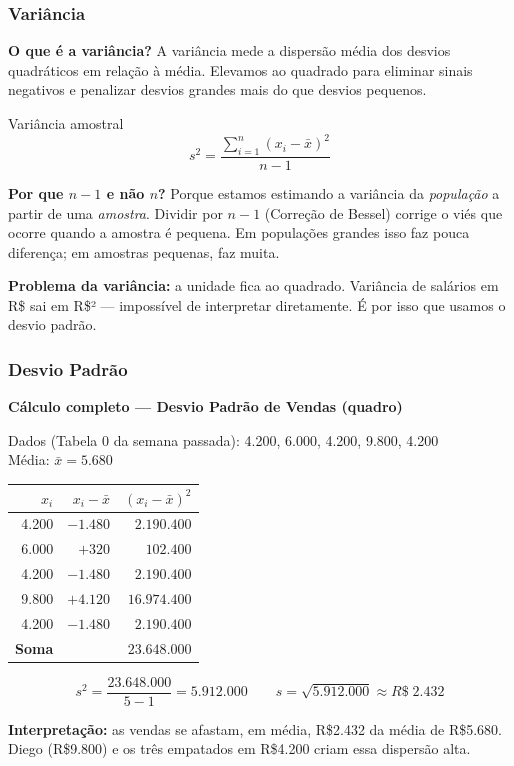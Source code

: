 \subsubsection*{Variância}

\begin{SolvedBox}
\textbf{O que é a variância?} A variância mede a dispersão média dos desvios
quadráticos em relação à média. Elevamos ao quadrado para eliminar sinais
negativos e penalizar desvios grandes mais do que desvios pequenos.

\begin{FormulaBox}{Variância amostral}
\[
s^2 = \frac{\sum_{i=1}^{n}(x_i - \bar{x})^2}{n - 1}
\]
\end{FormulaBox}

\textbf{Por que $n-1$ e não $n$?} Porque estamos estimando a variância da
\emph{população} a partir de uma \emph{amostra}. Dividir por $n-1$ (Correção
de Bessel) corrige o viés que ocorre quando a amostra é pequena. Em
populações grandes isso faz pouca diferença; em amostras pequenas, faz muita.

\textbf{Problema da variância:} a unidade fica ao quadrado.
Variância de salários em R\$ sai em R\$² — impossível de interpretar diretamente.
É por isso que usamos o desvio padrão.
\end{SolvedBox}

\subsubsection*{Desvio Padrão}

\begin{BoardBox}
\textbf{Cálculo completo — Desvio Padrão de Vendas (quadro)}

Dados (Tabela 0 da semana passada): 4.200, 6.000, 4.200, 9.800, 4.200\\
Média: $\bar{x} = 5.680$

\begin{center}
\begin{tabular}{|r|r|r|}
\hline
$x_i$ & $x_i - \bar{x}$ & $(x_i - \bar{x})^2$ \\
\hline
4.200 & $-1.480$ & $2.190.400$ \\
6.000 & $+320$   & $102.400$   \\
4.200 & $-1.480$ & $2.190.400$ \\
9.800 & $+4.120$ & $16.974.400$ \\
4.200 & $-1.480$ & $2.190.400$ \\
\hline
\textbf{Soma} & & $23.648.000$ \\
\hline
\end{tabular}
\end{center}

\[
s^2 = \frac{23.648.000}{5-1} = 5.912.000
\qquad
s = \sqrt{5.912.000} \approx R\$\;2.432
\]

\textbf{Interpretação:} as vendas se afastam, em média, R\$2.432 da média
de R\$5.680. Diego (R\$9.800) e os três empatados em R\$4.200 criam essa
dispersão alta.
\end{BoardBox}

